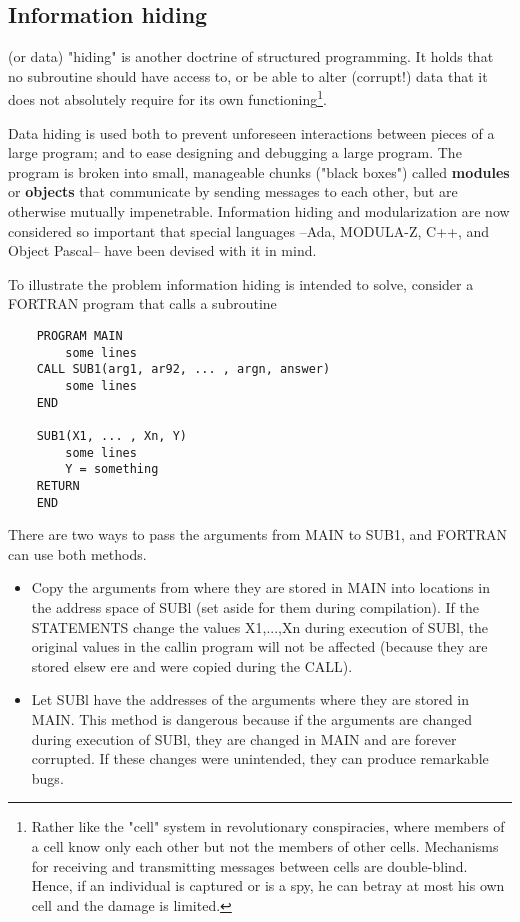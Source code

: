 \subsection{Information hiding}

 (or data) "hiding" is another doctrine of structured programming. It holds that no subroutine should have access to, or be able to alter (corrupt!) data that it does not absolutely require for its own functioning\footnote{Rather like the "cell" system in revolutionary conspiracies, where members of a cell know only each other but not the members of other cells. Mechanisms for receiving and transmitting messages between cells are double-blind. Hence, if an individual is captured or is a spy, he can betray at most his own cell and the damage is limited.}.

Data hiding is used both to prevent unforeseen interactions between pieces of a large program; and to ease designing and debugging a large program. The program is broken into small, manageable chunks ("black boxes") called \textbf{modules} or \textbf{objects} that communicate by sending messages to each other, but are otherwise mutually impenetrable. Information hiding and modularization are now considered so important that special languages --Ada, MODULA-Z, C++, and Object Pascal-- have been devised with it in mind.

To illustrate the problem information hiding is intended to solve, consider a FORTRAN program that calls a subroutine

\begin{lstlisting}
    PROGRAM MAIN
        some lines
    CALL SUB1(arg1, ar92, ... , argn, answer)
        some lines
    END

    SUB1(X1, ... , Xn, Y)
        some lines
        Y = something
    RETURN
    END
\end{lstlisting}

There are two ways to pass the arguments from MAIN to SUB1, and FORTRAN can use both methods.

\begin{itemize}
    \item Copy the arguments from where they are stored in MAIN into locations in the address space of SUBl (set aside for them during compilation). If the STATEMENTS change the values X1,...,Xn during execution of SUBl, the original values in the callin program will not be affected (because they are stored elsew ere and were copied during the CALL).
    \item Let SUBl have the addresses of the arguments where they are stored in MAIN. This method is dangerous because if the arguments are changed during execution of SUBl, they are changed in MAIN and are forever corrupted. If these changes were unintended, they can produce remarkable bugs.
\end{itemize}

